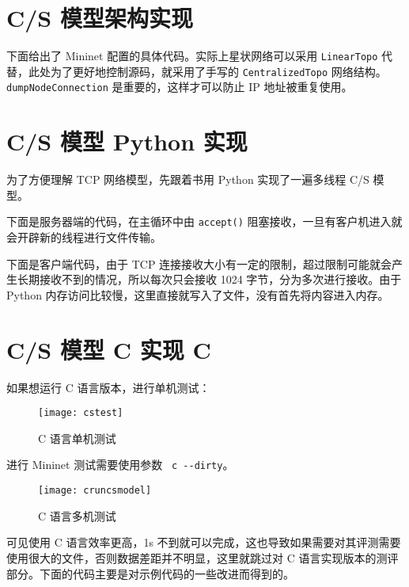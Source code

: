 \appendix

\section{C/S 模型架构实现}\label{sec:cscentralized}

下面给出了 Mininet 配置的具体代码。实际上星状网络可以采用 \verb"LinearTopo" 代替，此处为了更好地控制源码，就采用了手写的 \verb"CentralizedTopo" 网络结构。\verb"dumpNodeConnection" 是重要的，这样才可以防止 IP 地址被重复使用。


\section{C/S 模型 Python 实现 \faPython}\label{sec:cspython}

为了方便理解 TCP 网络模型，先跟着书用 Python 实现了一遍多线程 C/S 模型。

下面是服务器端的代码，在主循环中由 \verb"accept()" 阻塞接收，一旦有客户机进入就会开辟新的线程进行文件传输。


下面是客户端代码，由于 TCP 连接接收大小有一定的限制，超过限制可能就会产生长期接收不到的情况，所以每次只会接收 1024 字节，分为多次进行接收。由于 Python 内存访问比较慢，这里直接就写入了文件，没有首先将内容进入内存。


\section{C/S 模型 C 实现 \textsf{C}}\label{sec:csc}

如果想运行 C 语言版本，进行单机测试：
\begin{figure}[H]
    \centering
    \texttt{[image: cstest]}
    \caption{C 语言单机测试}
\end{figure}

进行 Mininet 测试需要使用参数 \verb" c --dirty"。

\begin{figure}[H]
    \centering
    \texttt{[image: cruncsmodel]}
    \caption{C 语言多机测试}
\end{figure}

可见使用 C 语言效率更高，1s 不到就可以完成，这也导致如果需要对其评测需要使用很大的文件，否则数据差距并不明显，这里就跳过对 C 语言实现版本的测评部分。下面的代码主要是对示例代码的一些改进而得到的。


